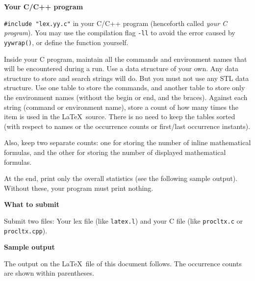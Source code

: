 \documentclass[12pt,fleqn,a4paper]{article}
\def\bs{{\tt\char92}}
\begin{document}
\bigskip
{\bf Your C/C++ program}

{\tt\#include "lex.yy.c"} in your C/C++ program (henceforth called {\it your
C program}). You may use the compilation flag {\tt-ll} to avoid the error caused by
{\tt yywrap()}, or define the function yourself.

Inside your C program, maintain all the commands and environment names that
will be encountered during a run. Use a data structure of your own. Any data
structure to store and search strings will do. But you must not use any
STL data structure. Use one table to store the commands, and another table
to store only the environment names (without the \bs begin or \bs end, and
the braces). Against each string (command or environment name), store
a count of how many times the item is used in the \LaTeX\ source.
There is no need to keep the tables sorted (with respect to names or
the occurrence counts or first/last occurrence instants).

Also, keep two separate counts: one for storing the number of inline
mathematical formulas, and the other for storing the number of displayed
mathematical formulas.

At the end, print only the overall statistics (see the following sample output).
Without these, your program must print nothing.

\bigskip
{\bf What to submit}

Submit two files: Your lex file (like {\tt latex.l}) and your C file (like
{\tt procltx.c} or {\tt procltx.cpp}).

\newpage
{\bf Sample output}

The output on the \LaTeX\ file of this document follows.
The occurrence counts are shown within parentheses.
\end{document}
